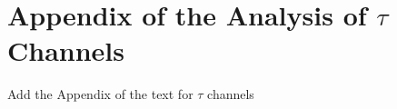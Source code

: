 \section{Appendix of the Analysis of $\tau$ Channels }
\label{sec:Apptaus}
Add the Appendix of the text for $\tau$ channels


